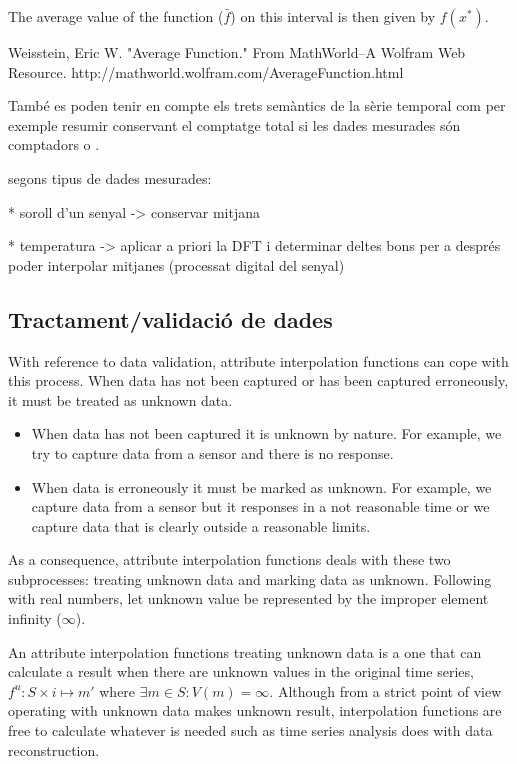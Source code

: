 The average value of the function ($\bar f$)  on this interval is then given by  $f(x^*)$.

Weisstein, Eric W. "Average Function." From MathWorld--A Wolfram Web Resource. http://mathworld.wolfram.com/AverageFunction.html



També es poden tenir en compte
els trets semàntics de la sèrie temporal com per exemple resumir
conservant el comptatge total si les dades mesurades són comptadors o .


segons tipus de dades mesurades:


* soroll d'un senyal -> conservar mitjana

* temperatura -> aplicar a priori la DFT i determinar deltes bons per a després poder interpolar mitjanes (processat digital del senyal)





\subsection{Tractament/validació de dades}\todo{}

With reference to data validation, attribute interpolation functions
can cope with this process. When data has not been captured or has
been captured erroneously, it must be treated as unknown data.
\begin{itemize}
\item When data has not been captured it is unknown by nature. For
  example, we try to capture data from a sensor and there is no
  response.
\item When data is erroneously it must be marked as unknown. For
  example, we capture data from a sensor but it responses in a not
  reasonable time or we capture data that is clearly outside a
  reasonable limits.
\end{itemize}
As a consequence, attribute interpolation functions deals with these
two subprocesses: treating unknown data and marking data as
unknown. Following with real numbers, let unknown value be represented
by the improper element infinity ($\infty$).  

An attribute interpolation functions treating unknown data is a one
that can calculate a result when there are unknown values in the
original time series, $f^u: S \times i \mapsto m'$ where $\exists m \in
S: V(m)=\infty$. Although from a strict point of view
operating with unknown data makes unknown result, interpolation
functions are free to calculate whatever is needed such as time series
analysis does with data reconstruction.

